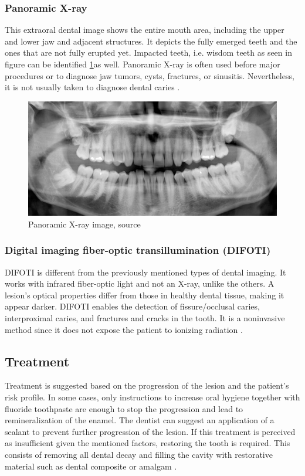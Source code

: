 \subsubsection{Panoramic X-ray}
This extraoral dental image shows the entire mouth area, including the upper and lower jaw and adjacent structures. It depicts the fully emerged teeth and the ones that are not fully erupted yet. Impacted teeth, i.e. wisdom teeth as seen in figure  can be identified \ref{fig:panoramatic_xray}as well. Panoramic X-ray is often used before major procedures or to diagnose jaw tumors, cysts, fractures, or sinusitis. Nevertheless, it is not usually taken to diagnose dental caries \cite{clevland_xray}.

\begin{figure}
    \centering
    \includegraphics[width=\linewidth]{images/panoramatic_xray.jpg}
    \caption{Panoramic X-ray image, source \cite{Panoramatic2017}}
    \label{fig:panoramatic_xray}
\end{figure}


\subsubsection{Digital imaging fiber-optic transillumination (DIFOTI)}
DIFOTI is different from the previously mentioned types of dental imaging. It works with infrared fiber-optic light and not an X-ray, unlike the others. A lesion's optical properties differ from those in healthy dental tissue, making it appear darker. DIFOTI enables the detection of fissure/occlusal caries, interproximal caries, and fractures and cracks in the tooth. It is a noninvasive method since it does not expose the patient to ionizing radiation \cite{Strassler2014}.

\subsection{Treatment}
Treatment is suggested based on the progression of the lesion and the patient's risk profile. In some cases, only instructions to increase oral hygiene together with fluoride toothpaste are enough to stop the progression and lead to remineralization of the enamel. The dentist can suggest an application of a sealant to prevent further progression of the lesion. If this treatment is perceived as insufficient given the mentioned factors, restoring the tooth is required. This consists of removing all dental decay and filling the cavity with restorative material such as dental composite or amalgam \cite{2019a}\cite{2015}.


